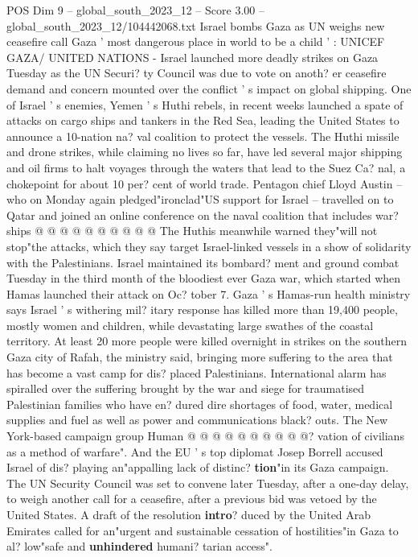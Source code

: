 \begin{textsample}{POS Dim 9 – global\_south\_2023\_12 – Score 3.00 – global\_south\_2023\_12/104442068.txt}  \label{ex:f9_pos_014}
Israel bombs Gaza as UN weighs new ceasefire call Gaza ' most dangerous place in world to be a child ' : UNICEF GAZA/ UNITED NATIONS - Israel launched more deadly strikes on Gaza Tuesday as the UN Securi? ty Council was due to vote on anoth? er ceasefire demand and concern mounted over the conflict ' s impact on global shipping.
One of Israel ' s enemies, Yemen ' s Huthi rebels, in recent weeks launched a spate of attacks on cargo ships and tankers in the Red Sea, leading the United States to announce a 10-nation na? val coalition to protect the vessels.
The Huthi missile and drone strikes, while claiming no lives so far, have led several major shipping and oil firms to halt voyages through the waters that lead to the Suez Ca? nal, a chokepoint for about 10 per? cent of world trade.
Pentagon chief Lloyd Austin -- who on Monday again pledged"ironclad"US support for Israel -- travelled on to Qatar and joined an online conference on the naval coalition that includes war? ships @ @ @ @ @ @ @ @ @ @ The Huthis meanwhile warned they"will not stop"the attacks, which they say target Israel-linked vessels in a show of solidarity with the Palestinians.
Israel maintained its bombard? ment and ground combat Tuesday in the third month of the bloodiest ever Gaza war, which started when Hamas launched their attack on Oc? tober 7.
Gaza ' s Hamas-run health ministry says Israel ' s withering mil? itary response has killed more than 19,400 people, mostly women and children, while devastating large swathes of the coastal territory.
At least 20 more people were killed overnight in strikes on the southern Gaza city of Rafah, the ministry said, bringing more suffering to the area that has become a vast camp for dis? placed Palestinians.
International alarm has spiralled over the suffering brought by the war and siege for traumatised Palestinian families who have en? dured dire shortages of food, water, medical supplies and fuel as well as power and communications black? outs.
The New York-based campaign group Human @ @ @ @ @ @ @ @ @ @? vation of civilians as a method of warfare".
And the EU ' s top diplomat Josep Borrell accused Israel of dis? playing an"appalling lack of distinc? \textbf{tion}"in its Gaza campaign.
The UN Security Council was set to convene later Tuesday, after a one-day delay, to weigh another call for a ceasefire, after a previous bid was vetoed by the United States.
A draft of the resolution \textbf{intro}? duced by the United Arab Emirates called for an"urgent and sustainable cessation of hostilities"in Gaza to al? low"safe and \textbf{unhindered} humani? tarian access".

\end{textsample}
